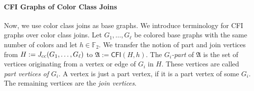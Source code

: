 \documentclass[]{lmcs}
\newcommand{\FF}{\mathbb{F}}
\newcommand{\defining}[1]{\emph{#1}}
\newcommand{\StructA}{\mathfrak{A}}
\newcommand{\CFIsym}{\mathsf{CFI}}
\newcommand{\CFI}[1]{\CFIsym(#1)}
\begin{document}
\paragraph{CFI Graphs of Color Class Joins}
Now, we use color class joins as base graphs.
We introduce terminology for CFI graphs over color class joins.
Let $G_1,\dots, G_\ell$ be colored base graphs with the same number of colors
and let $h \in \FF_2$.
We transfer the notion of part and join vertices from $H := J_{\text{cc}}(G_1, \dots, G_\ell)$ to $\StructA := \CFI{H,h}$.
The \defining{$G_i$-part} of $\StructA$
is the set of vertices originating from a vertex or edge of $G_i$ in $H$.
These vertices are called \defining{part vertices of $G_i$}.
A vertex is just a part vertex, if it is a part vertex of some $G_i$.
The remaining vertices are the \defining{join vertices}.
\end{document}
